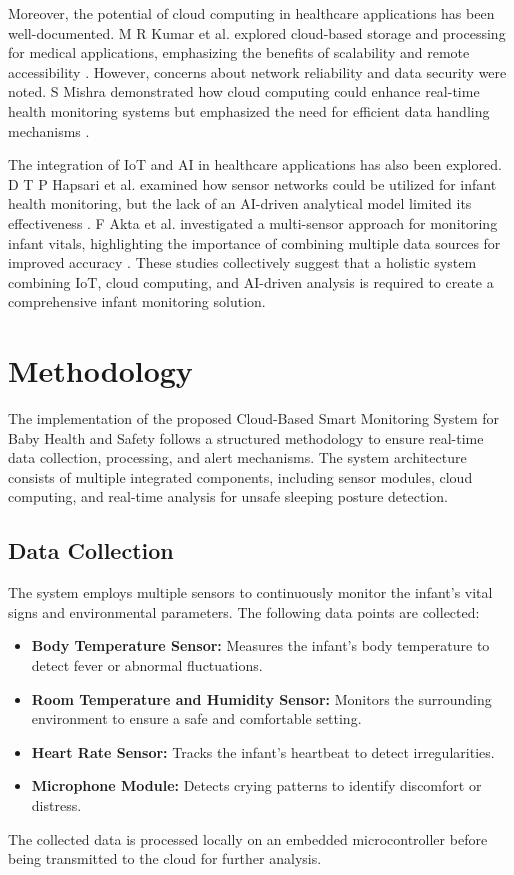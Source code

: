 \documentclass[conference]{IEEEtran}
\begin{document}
Moreover, the potential of cloud computing in healthcare applications has been well-documented. M R Kumar et al. explored cloud-based storage and processing for medical applications, emphasizing the benefits of scalability and remote accessibility \cite{ref6}. However, concerns about network reliability and data security were noted. S Mishra demonstrated how cloud computing could enhance real-time health monitoring systems but emphasized the need for efficient data handling mechanisms \cite{ref7}.  

The integration of IoT and AI in healthcare applications has also been explored. D T P Hapsari et al. examined how sensor networks could be utilized for infant health monitoring, but the lack of an AI-driven analytical model limited its effectiveness \cite{ref8}. F Akta et al. investigated a multi-sensor approach for monitoring infant vitals, highlighting the importance of combining multiple data sources for improved accuracy \cite{ref9}. These studies collectively suggest that a holistic system combining IoT, cloud computing, and AI-driven analysis is required to create a comprehensive infant monitoring solution.  

\section{Methodology}
The implementation of the proposed Cloud-Based Smart Monitoring System for Baby Health and Safety follows a structured methodology to ensure real-time data collection, processing, and alert mechanisms. The system architecture consists of multiple integrated components, including sensor modules, cloud computing, and real-time analysis for unsafe sleeping posture detection.

\subsection{Data Collection}
The system employs multiple sensors to continuously monitor the infant’s vital signs and environmental parameters. The following data points are collected:
\begin{itemize}
    \item \textbf{Body Temperature Sensor:} Measures the infant’s body temperature to detect fever or abnormal fluctuations.
    \item \textbf{Room Temperature and Humidity Sensor:} Monitors the surrounding environment to ensure a safe and comfortable setting.
    \item \textbf{Heart Rate Sensor:} Tracks the infant’s heartbeat to detect irregularities.
    \item \textbf{Microphone Module:} Detects crying patterns to identify discomfort or distress.
\end{itemize}
The collected data is processed locally on an embedded microcontroller before being transmitted to the cloud for further analysis.
\end{document}
